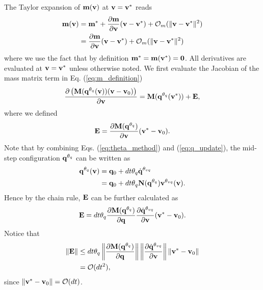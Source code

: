 
The Taylor expansion of ${\mathbf{m}}({\mathbf{v}})$ at ${\mathbf{v}}={\mathbf{v}}^*$ reads
\begin{align}
	\mf{m}(\mf{v}) &= \mf{m}^* + \frac{\partial \mf{m}}{\partial \mf{v}} (\mf{v}-\mf{v}^*) +
	\mathcal{O}_m(\Vert\mf{v}-\mf{v}^*\Vert^2)\nonumber\\
	&=\frac{\partial \mf{m}}{\partial \mf{v}}(\mf{v}-\mf{v}^*) +
	\mathcal{O}_m(\Vert\mf{v}-\mf{v}^*\Vert^2)
	\label{eq:m_taylor_expansion}
\end{align}
where we use the fact that by definition ${\mathbf{m}}^*={\mathbf{m}}({\mathbf{v}}^*)={\mathbf{0}}$. All
derivatives are evaluated at ${\mathbf{v}} = {\mathbf{v}}^*$ unless otherwise noted. We
first evaluate the Jacobian of the mass matrix term in Eq.
(\ref{eq:m_definition})
\begin{align*}
	\frac{\partial \left( {\mathbf{M}}({\mathbf{q}}^{\theta_{q}}({\mathbf{v}}))({\mathbf{v}}-{\mathbf{v}}_0) \right)}{\partial {\mathbf{v}}}
	= {\mathbf{M}}({\mathbf{q}}^{\theta_{q}}({\mathbf{v}}^*)) + {\mathbf{E}},
\end{align*}
where we defined
\begin{align*}
	{\mathbf{E}} = \frac{\partial {\mathbf{M}}({\mathbf{q}}^{\theta_{q}})}{\partial{\mathbf{v}}} ({\mathbf{v}}^*-{\mathbf{v}}_0).
\end{align*}
Note that by combining Eqs. (\ref{eq:theta_method}) and (\ref{eq:q_update}), the
mid-step configuration ${\mathbf{q}}^{\theta_q}$ can be written as
\begin{align*}
	{\mathbf{q}}^{\theta_q}({\mathbf{v}}) &= {\mathbf{q}}_0 + dt \theta_q \dot{{\mathbf{q}}}^{\theta_{vq}} \\
	                          &= {\mathbf{q}}_0 + dt \theta_q {\mathbf{N}}({\mathbf{q}}^{\theta_{q}}){\mathbf{v}}^{\theta_{vq}}({\mathbf{v}}).
\end{align*}
Hence by the chain rule, ${\mathbf{E}}$ can be further calculated as
\begin{align*}
	{\mathbf{E}} = dt\theta_q\frac{\partial {\mathbf{M}}({\mathbf{q}}^{\theta_{q}}) }{\partial{\mathbf{q}}}
             \frac{\partial\dot{{\mathbf{q}}}^{\theta_{vq}}}{\partial{\mathbf{v}}}
			 ({\mathbf{v}}^*-{\mathbf{v}}_0).
\end{align*}
Notice that 
\begin{align*}
		\Vert{\mathbf{E}}\Vert 
		&\le dt\theta_q \left\| \frac{\partial{\mathbf{M}}({\mathbf{q}}^{\theta_{q}})}{\partial{\mathbf{q}}}  \right\|
			\left\| \frac{\partial\dot{{\mathbf{q}}}^{\theta_{vq}}}{\partial{\mathbf{v}}}  \right\|
		    \left\| {\mathbf{v}}^*-{\mathbf{v}}_0 \right\| \\
		&= \mathcal{O}(dt^2),
\end{align*}
since $\Vert{\mathbf{v}}^*-{\mathbf{v}}_0\Vert = \mathcal{O}(dt)$.

